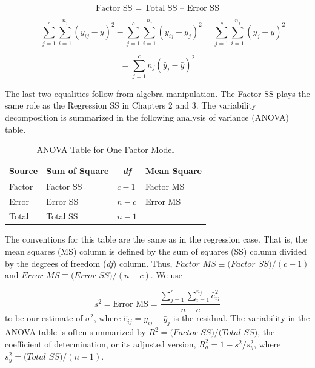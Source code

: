 \begin{equation*}
\text{Factor SS = Total SS -- Error SS}
\end{equation*}

\begin{equation*}
=\sum_{j=1}^{c}\sum_{i=1}^{n_{j}}(y_{ij}-\bar{y})^{2}-\sum_{j=1}^{c}%
\sum_{i=1}^{n_{j}}(y_{ij}-\bar{y}_{j})^{2}=\sum_{j=1}^{c}\sum_{i=1}^{n_{j}}(%
\bar{y}_{j}-\bar{y})^{2}
\end{equation*}

\begin{equation*}
=\sum_{j=1}^{c}n_{j}(\bar{y}_{j}-\bar{y})^{2}
\end{equation*}

The last two equalities follow from algebra manipulation. The Factor
SS plays the same role as the Regression SS in Chapters 2 and 3. The
variability decomposition is summarized in the following analysis of
variance (ANOVA) table.

  \begin{center}  \begin{table}[h]
\caption{\label{T4:ANOVAOneFactor} ANOVA Table for One Factor Model}
\begin{tabular}{cccc}
\hline
Source & Sum of Square & \textit{df} & Mean Square \\ \hline
\multicolumn{1}{l}{Factor} & \multicolumn{1}{l}{Factor SS} &
\multicolumn{1}{l}{$c-1$} & \multicolumn{1}{l}{Factor MS} \\
\multicolumn{1}{l}{Error} & \multicolumn{1}{l}{Error SS} &
\multicolumn{1}{l}{$n-c$} & \multicolumn{1}{l}{Error MS} \\
\multicolumn{1}{l}{Total} & \multicolumn{1}{l}{Total SS} &
\multicolumn{1}{l}{$n-1$} & \multicolumn{1}{l}{} \\ \hline
\end{tabular}

\end{table}  \end{center}  

The conventions for this table are the same as in the regression case. That
is, the mean squares (MS) column is defined by the sum of squares (SS)
column divided by the degrees of freedom (\textit{df}) column. Thus, $Factor$
$MS\equiv (Factor$ $SS)/(c-1)$ and $Error$ $MS\equiv (Error$ $SS)/(n-c)$. We
use

\begin{equation*}
s^{2}=\text{Error MS}=\frac{\sum_{j=1}^{c}\sum_{i=1}^{n_{j}}\hat{e}_{ij}^{2}%
}{n-c}
\end{equation*}%
to be our estimate of $\sigma ^{2}$, where $\hat{e}_{ij}=y_{ij}-\bar{y}_{j}$
is the residual. The variability in the ANOVA table is often summarized by $%
R^{2}=(Factor$ $SS)/(Total$ $SS)$, the coefficient of determination, or its
adjusted version, $R_a^{2}=1-s^{2}/s_{y}^{2}$, where $s_{y}^{2}=(Total$ $%
SS)/(n-1)$.


